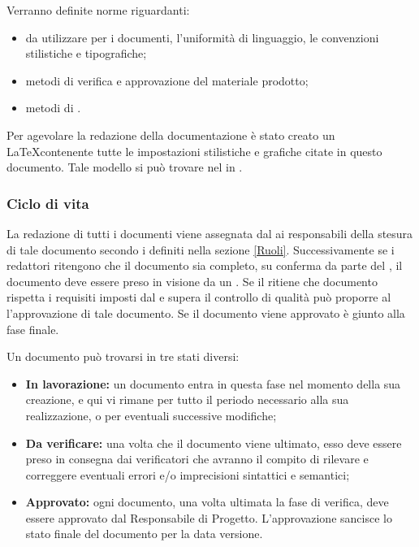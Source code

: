 \documentclass[12pt,a4paper]{article}
\begin{document}
Verranno definite norme riguardanti:
\begin{itemize}
	\item {} da utilizzare per i documenti, l'uniformità di linguaggio, le convenzioni stilistiche e tipografiche;
	\item metodi di verifica e approvazione del materiale prodotto;
	\item metodi di .
\end{itemize}

Per agevolare la redazione della documentazione è stato creato un  \LaTeX contenente tutte le impostazioni stilistiche e grafiche citate in questo documento. Tale modello si può trovare nel  in .

\subsubsection{Ciclo di vita}

La redazione di tutti i documenti viene assegnata dal \PM{} ai responsabili della stesura di tale documento secondo i  definiti nella sezione \ref{Ruoli}. Successivamente se i redattori ritengono che il documento sia completo, su conferma da parte del \PM, il documento deve essere preso in visione da un \VR. Se il \VR{} ritiene che documento rispetta i requisiti imposti dal \PR{} e supera il controllo di qualità può proporre al \PM{} l'approvazione di tale documento. Se il documento viene approvato è giunto alla fase finale.

Un documento può trovarsi in tre stati diversi:
\begin{itemize}
	\item \textbf{In lavorazione:} un documento entra in questa fase nel momento della sua creazione, e qui vi rimane per tutto il periodo necessario alla sua realizzazione, o per eventuali successive modifiche;
	\item \textbf{Da verificare:} una volta che il documento viene ultimato, esso deve essere preso in consegna dai verificatori che avranno il compito di rilevare e correggere eventuali errori e/o imprecisioni sintattici e semantici;
	\item \textbf{Approvato:} ogni documento, una volta ultimata la fase di verifica, deve essere approvato dal Responsabile di Progetto. L’approvazione sancisce lo stato finale del documento per la data versione.
\end{itemize}
\end{document}

